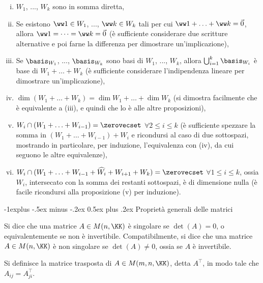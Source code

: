 \documentclass[10pt,landscape]{article}
\makeatletter
\renewcommand{\subsection}{\@startsection{subsection}{2}{0mm}%
	{-1explus -.5ex minus -.2ex}%
	{0.5ex plus .2ex}%
	{\normalfont\normalsize\bfseries}}
\makeatother
\begin{document}
\begin{multicols}{3}
		\begin{enumerate}[(i)]
			\itemsep0em
			\item $W_1$, ..., $W_k$ sono in somma diretta,
			\item Se esistono $\ww 1 \in W_1$, ..., $\ww k \in W_k$ tali per cui
			$\ww 1 + \ldots + \ww k = \vec 0$, allora $\ww 1 = \cdots = \ww k = \vec 0$ (è sufficiente considerare due scritture alternative e poi farne la differenza per dimostrare un'implicazione),
			\item Se $\basis_{W_1}$, ..., $\basis_{W_k}$ sono basi di $W_1$, ..., $W_k$,
			allora $\bigcup_{i=1}^k \basis_{W_i}$ è base di $W_1 + \ldots + W_k$ (è sufficiente considerare l'indipendenza lineare per dimostrare un'implicazione),
			\item $\dim (W_1 + \ldots + W_k) = \dim W_1 + \ldots + \dim W_k$ (si dimostra facilmente che è equivalente a (iii), e quindi che lo è alle altre proposizioni),
			\item $W_i \cap (W_1 + \ldots + W_{i-1}) = \zerovecset$ $\forall 2 \leq i \leq k$ (è sufficiente spezzare la somma in $(W_1 + \ldots + W_{i-1}) + W_i$ e ricondursi al caso di due sottospazi, mostrando in particolare, per induzione, l'equivalenza con (iv), da cui seguono le altre equivalenze),
			\item $W_i \cap (W_1 + \ldots + W_{i-1} + \widehat{W_i} + W_{i+1} + W_k) = \zerovecset$ $\forall 1 \leq i \leq k$, ossia $W_i$, intersecato con la somma
			dei restanti sottospazi, è di dimensione nulla (è facile ricondursi alla proposizione (v) per induzione).
		\end{enumerate}
		
		\subsection{Proprietà generali delle matrici}
		
		Si dice che una matrice $A \in M(n, \KK)$ è singolare se $\det(A) = 0$,
		o equivalentemente se non è invertibile. Compatibilmente, si
		dice che una matrice $A \in M(n, \KK)$ è non singolare se $\det(A) \neq
		0$, ossia se $A$ è invertibile.
		
		Si definisce la matrice trasposta di
		$A \in M(m, n, \KK)$, detta $A^\top$, in modo
		tale che $A_{ij} = A^\top_{ji}$.
		

\end{multicols}
\end{document}
